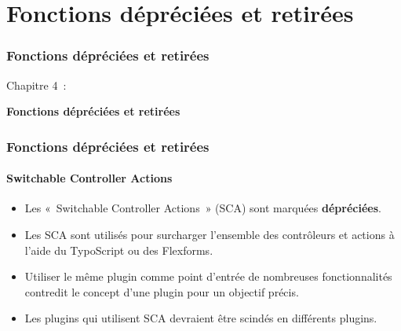 %

\section{Fonctions dépréciées et retirées}
\begin{frame}[fragile]
	\frametitle{Fonctions dépréciées et retirées}

	\begin{center}\huge{Chapitre 4~:}\end{center}
	\begin{center}\huge{\color{typo3darkgrey}\textbf{Fonctions dépréciées et retirées}}\end{center}

\end{frame}


\begin{frame}[fragile]
	\frametitle{Fonctions dépréciées et retirées}
	\framesubtitle{Switchable Controller Actions}

	\begin{itemize}
		\item Les «~Switchable Controller Actions~» (SCA) sont marquées \textbf{dépréciées}.
		\item Les SCA sont utilisés pour surcharger l'ensemble des contrôleurs et actions à l'aide
			du TypoScript ou des Flexforms.
		\item Utiliser le même plugin comme point d'entrée de nombreuses fonctionnalités contredit
			le concept d'une plugin pour un objectif précis.
		\item Les plugins qui utilisent SCA devraient être scindés en différents plugins.
	\end{itemize}

\end{frame}


